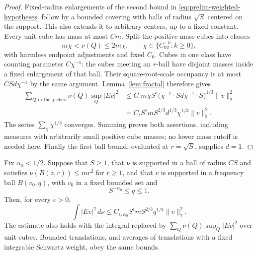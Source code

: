 \begin{proof}
Fixed-radius enlargements of the second bound in
\eqref{eq:prelim-weighted-hypotheses} follow by a bounded covering with
balls of radius $\sqrt S$ centered on the support.  This also extends it
to arbitrary centers, up to a fixed constant.  Every unit cube has mass
at most $Cm$.  Split the positive-mass cubes into classes
\[
 m\chi<\nu(Q)\leq2m\chi,
 \qquad \chi\in\{C_02^{-k}:k\geq0\},
\]
with harmless endpoint adjustments and fixed $C_0$.  Cubes in one class
have counting parameter $C\chi^{-1}$: the cubes meeting an $r$-ball have
disjoint masses inside a fixed enlargement of that ball.  Their
square-root-scale occupancy is at most $CSd\chi^{-1}$ by the same
argument.  Lemma~\ref{lem:fractal} therefore gives
\begin{align*}
 \sum_{Q\text{ in the }\chi\text{ class}}\nu(Q)\sup_Q|Ev|^2
 &\leq C_\epsilon m\chi S^\epsilon
   \bigl(\chi^{-1}\cdot Sd\chi^{-1}\cdot S\bigr)^{1/3}
   \|v\|_2^2\\
 &=C_\epsilon S^\epsilon mS^{2/3}d^{1/3}
   \chi^{1/3}\|v\|_2^2.
\end{align*}
The series $\sum_\chi\chi^{1/3}$ converges.  Summing proves both
assertions, including measures with arbitrarily small positive cube masses;
no lower mass cutoff is needed here.  Finally the first ball bound, evaluated
at $r=\sqrt S$, supplies $d=1$.
\end{proof}

\begin{lemma}
\label{lem:cap}
Fix $\alpha_0<1/2$.  Suppose that $S\geq1$, that $\nu$ is supported in
a ball of radius $CS$ and satisfies $\nu(B(z,r))\leq mr^2$ for $r\geq1$,
and that $v$ is supported in a frequency ball $B(v_0,q)$, with $v_0$ in a
fixed bounded set and
\[
 S^{-\alpha_0}\leq q\leq1.
\]
Then, for every $\epsilon>0$,
\begin{equation}
 \int |Ev|^2\,d\nu
 \leq C_{\epsilon,\alpha_0}S^\epsilon
       mS^{2/3}q^{1/3}\|v\|_2^2.
 \label{eq:prelim-cap-estimate}
\end{equation}
The estimate also holds with the integral replaced by
$\sum_Q\nu(Q)\sup_Q|Ev|^2$ over unit cubes.  Bounded translations, and
averages of translations with a fixed integrable Schwartz weight, obey the
same bounds.
\end{lemma}


